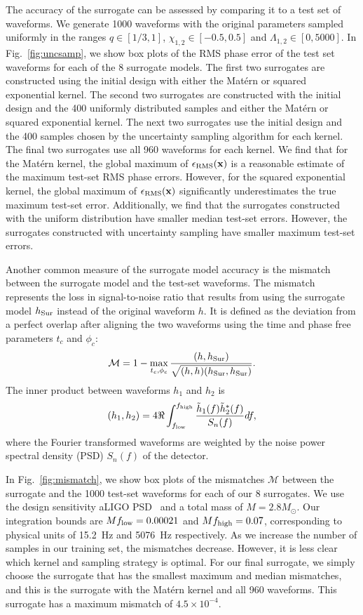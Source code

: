 \documentclass[prd,aps,letter,twocolumn,floatfix,notitlepage,nofootinbib]{revtex4-1}
\def\bx{\mathbf{x}}
\begin{document}
The accuracy of the surrogate can be assessed by comparing it to a test set of waveforms. We generate 1000 waveforms with the original parameters sampled uniformly in the ranges $q \in [1/3, 1]$, $\chi_{1,2} \in [-0.5, 0.5]$ and $\Lambda_{1,2} \in [0, 5000]$. In Fig.~\ref{fig:uncsamp}, we show box plots of the RMS phase error of the test set waveforms for each of the 8 surrogate models. The first two surrogates are constructed using the initial design with either the Mat\'{e}rn or squared exponential kernel. The second two surrogates are constructed with the initial design and the 400 uniformly distributed samples and either the Mat\'{e}rn or squared exponential kernel. The next two surrogates use the initial design and the 400 samples chosen by the uncertainty sampling algorithm for each kernel. The final two surrogates use all 960 waveforms for each kernel. We find that for the Mat\'{e}rn kernel, the global maximum of $\epsilon_{\rm RMS}(\bx)$ is a reasonable estimate of the maximum test-set RMS phase errors. However, for the squared exponential kernel, the global maximum of $\epsilon_{\rm RMS}(\bx)$ significantly underestimates the true maximum test-set error. Additionally, we find that the surrogates constructed with the uniform distribution have smaller median test-set errors. However, the surrogates constructed with uncertainty sampling have smaller maximum test-set errors.

Another common measure of the surrogate model accuracy is the mismatch between the surrogate model and the test-set waveforms.
The mismatch represents the loss in signal-to-noise ratio that results from using the surrogate model $h_{\rm Sur}$ instead of the original waveform $h$. It is defined as the deviation from a perfect overlap after aligning the two waveforms using the time and phase free parameters $t_c$ and $\phi_c$:
\begin{equation}
\mathcal{M} = 1 - \max_{t_c, \phi_c} \frac{(h, h_{\rm Sur})} {\sqrt{(h, h) (h_{\rm Sur}, h_{\rm Sur})}}.
\end{equation}
The inner product between waveforms $h_1$ and $h_2$ is
\begin{equation}
(h_1, h_2) = 4 \Re \int_{f_{\rm low}}^{f_{\rm high}} \frac{\tilde h_1(f) \tilde h^*_2(f)} {S_n(f)} df,
\end{equation}
where the Fourier transformed waveforms are weighted by the noise power spectral density (PSD) $S_n(f)$ of the detector.

In Fig.~\ref{fig:mismatch}, we show box plots of the mismatches $\mathcal{M}$ between the surrogate and the 1000 test-set waveforms for each of our 8 surrogates. We use the design sensitivity aLIGO PSD~\cite{Aasi:2013wya} and a total mass of $M=2.8M_\odot$. Our integration bounds are $Mf_{\rm low} = 0.00021$ and $Mf_{\rm high} = 0.07$, corresponding to physical units of 15.2~Hz and 5076~Hz respectively. As we increase the number of samples in our training set, the mismatches decrease. However, it is less clear which kernel and sampling strategy is optimal. For our final surrogate, we simply choose the surrogate that has the smallest maximum and median mismatches, and this is the surrogate with the Mat\'{e}rn kernel and all 960 waveforms. This surrogate has a maximum mismatch of $4.5\times 10^{-4}$. 
\end{document}
